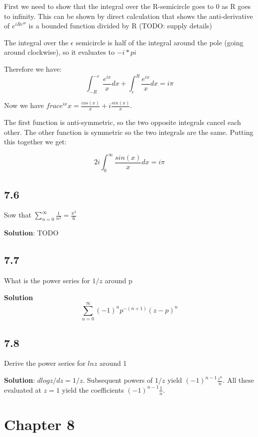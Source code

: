 \documentclass[]{article}
\begin{document}
First we need to show that the integral over the R-semicircle goes to 0 as R goes to infinity. This can be shown by direct calculation that shows the anti-derivative of 
$e^{iRe^{i\theta}}$ is a bounded function divided by R (TODO: supply details)
 
The integral over the $\epsilon$ semicircle is half of the integral around the pole (going around clockwise), so it evaluates to $-i*pi$

Therefore we have:
\begin{equation}
\int_{-R}^{-\epsilon}\frac{e^{ix}}{x}dx + \int_{\epsilon}^R\frac{e^{ix}}{x}dx = i\pi
\end{equation}

Now we have $frac{e^{ix}}{x} = \frac{cos(x)}{x} + i\frac{sin(x)}{x}$.

The first function is anti-symmetric, so the two opposite integrals cancel each other.
The other function is symmetric so the two integrals are the same. Putting this together we get:

\begin{equation}
2i\int_{0}^{\infty}\frac{sin(x)}{x}dx = i\pi
\end{equation}



\subsection*{7.6}
Sow that $\sum_{n=0}^\infty \frac{1}{n^2} = \frac{\pi^2}{6}$

\textbf{Solution}: TODO

\subsection*{7.7}
What is the power series for $1/z$ around p

\textbf{Solution}
$$\sum_{n=0}^\infty (-1)^n p ^{-(n+1)} (z-p)^n$$

\subsection*{7.8}
Derive the power series for $lnz$ around 1

\textbf{Solution}: 
$dlogz/dz = 1/z$. Subsequent powers of $1/z$ yield $(-1)^{n-1} \frac{z^{n}}{n}$.
All these evaluated at $z = 1$ yield the coefficients $(-1)^{n-1}\frac{1}{n}$.

\section*{Chapter 8}
\end{document}
